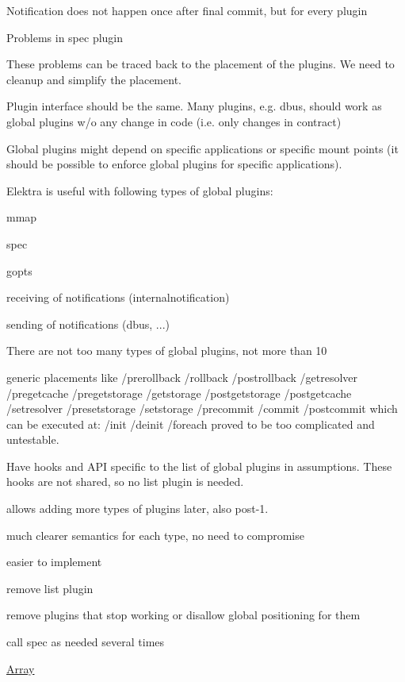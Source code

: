 
\begin{DoxyItemize}
\item Notification does not happen once after final commit, but for every plugin
\item Problems in spec plugin
\end{DoxyItemize}

These problems can be traced back to the placement of the plugins. We need to cleanup and simplify the placement.


\begin{DoxyItemize}
\item Plugin interface should be the same. Many plugins, e.\+g. dbus, should work as global plugins w/o any change in code (i.\+e. only changes in contract)
\item Global plugins might depend on specific applications or specific mount points (it should be possible to enforce global plugins for specific applications).
\end{DoxyItemize}


\begin{DoxyItemize}
\item Elektra is useful with following types of global plugins\+:
\begin{DoxyItemize}
\item mmap
\item spec
\item gopts
\item receiving of notifications (internalnotification)
\item sending of notifications (dbus, ...)
\end{DoxyItemize}
\item There are not too many types of global plugins, not more than 10
\end{DoxyItemize}


\begin{DoxyItemize}
\item generic placements like /prerollback /rollback /postrollback /getresolver /pregetcache /pregetstorage /getstorage /postgetstorage /postgetcache /setresolver /presetstorage /setstorage /precommit /commit /postcommit which can be executed at\+: /init /deinit /foreach proved to be too complicated and untestable.
\end{DoxyItemize}

Have hooks and A\+PI specific to the list of global plugins in assumptions. These hooks are not shared, so no {\ttfamily list} plugin is needed.


\begin{DoxyItemize}
\item allows adding more types of plugins later, also post-\/1.
\item much clearer semantics for each type, no need to compromise
\item easier to implement
\end{DoxyItemize}


\begin{DoxyItemize}
\item remove {\ttfamily list} plugin
\item remove plugins that stop working or disallow global positioning for them
\item call {\ttfamily spec} as needed several times
\end{DoxyItemize}


\begin{DoxyItemize}
\item \hyperlink{doc_decisions_array_md}{Array}
\end{DoxyItemize}